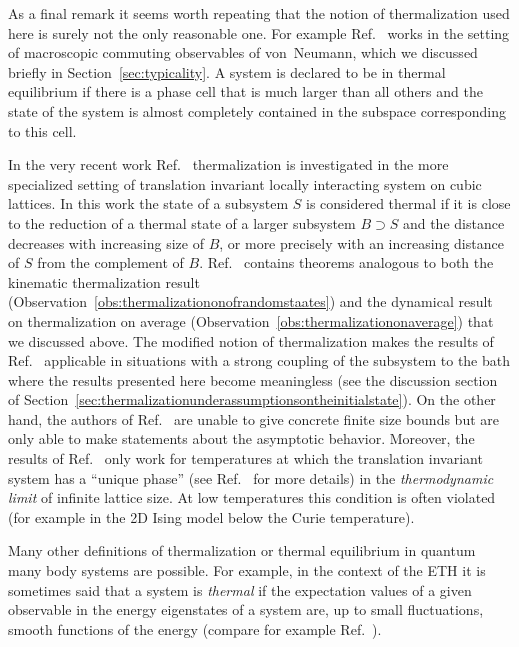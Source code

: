 \documentclass[a4paper,12pt,listof=totoc,index=totoc,bibliography=totoc,headsepline=false,headings=normal,BCOR16.153846mm,DIV12,headinclude,twoside,cleardoublepage=empty,numbers=noenddot,final]{scrreprt}
\theoremstyle{mystyle}
\numberwithin{equation}{section}
\numberwithin{figure}{section}
\numberwithin{lemma}{section}
\numberwithin{theorem}{section}
\numberwithin{corollary}{section}
\numberwithin{definition}{section}
\numberwithin{conjecture}{section}
\numberwithin{observation}{section}
\newcommand{\+}{\mkern2mu}
\DeclareMathOperator{\1}{\mathds{1}}
\begin{document}
As a final remark it seems worth repeating that the notion of thermalization used here is surely not the only reasonable one.
For example Ref.~\cite{0907.0108v1} works in the setting of macroscopic commuting observables of von~Neumann, which we discussed briefly in Section~\ref{sec:typicality}.
A system is declared to be in thermal equilibrium if there is a phase cell that is much larger than all others and the state of the system is almost completely contained in the subspace corresponding to this cell.

In the very recent work Ref.~\cite{Mueller2013} thermalization is investigated in the more specialized setting of translation invariant locally interacting system on cubic lattices.
In this work the state of a subsystem $S$ is considered thermal if it is close to the reduction of a thermal state of a larger subsystem $B \supset S$ and the distance decreases with increasing size of $B$, or more precisely with an increasing distance of $S$ from the complement of $B$.
Ref.~\cite{Mueller2013} contains theorems analogous to both the kinematic thermalization result (Observation~\ref{obs:thermalizationonofrandomstaates}) and the dynamical result on thermalization on average (Observation~\ref{obs:thermalizationonaverage}) that we discussed above.
The modified notion of thermalization makes the results of Ref.~\cite{Mueller2013} applicable in situations with a strong coupling of the subsystem to the bath where the results presented here become meaningless (see the discussion section of Section~\ref{sec:thermalizationunderassumptionsontheinitialstate}).
On the other hand, the authors of Ref.~\cite{Mueller2013} are unable to give concrete finite size bounds but are only able to make statements about the asymptotic behavior.
Moreover, the results of Ref.~\cite{Mueller2013} only work for temperatures at which the translation invariant system has a ``unique phase'' (see Ref.~\cite{Reed1980,Mueller2013} for more details) in the \emph{thermodynamic limit} of infinite lattice size.
At low temperatures this condition is often violated (for example in the 2D Ising model below the Curie temperature).

Many other definitions of thermalization or thermal equilibrium in quantum many body systems are possible.
For example, in the context of the ETH it is sometimes said that a system is \emph{thermal} if the expectation values of a given observable in the energy eigenstates of a system are, up to small fluctuations, smooth functions of the energy (compare for example Ref.~\cite{Beugeling2013}).
\end{document}
